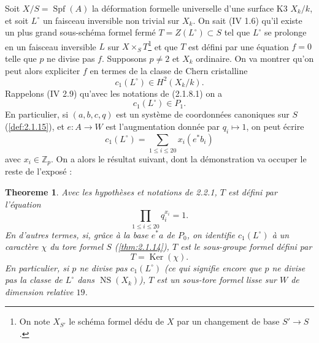 \documentclass[12pt,a4paper]{article}
\theoremstyle{plain}
\newtheorem{theorem}{Theoreme}[section]
\theoremstyle{definition}
\theoremstyle{remark}
\DeclareMathOperator{\Ker}{Ker}
\DeclareMathOperator{\Spf}{Spf}
\providecommand{\Ker}{\operatorname{Ker}}
\providecommand{\NS}{\operatorname{NS}}
\begin{document}
\subsubsection{}
Soit $X/S = \Spf(A)$ la d\'eformation formelle universelle d'une surface K3 $X_k/k$, et soit $L^\circ$ un faisceau inversible non trivial sur $X_k$. On sait (IV 1.6) qu'il existe un plus grand sous-sch\'ema formel ferm\'e $T = Z(L^\circ) \subset S$ tel que $L^\circ$ se prolonge en un faisceau inversible $L$ sur $X \times_S T$\footnote{On note $X_{S'}$ le sch\'ema formel d\'edu de $X$ par un changement de base $S' \to S$.} et que $T$ est d\'efini par une \'equation $f = 0$ telle que $p$ ne divise pas $f$. Supposons $p \neq 2$ et $X_k$ ordinaire. On va montrer qu'on peut alors expliciter $f$ en termes de la classe de Chern cristalline
\begin{equation}\tag{2.2.1.1}
c_1(L^\circ) \in H^2(X_k/k). 
\end{equation}
Rappelons (IV 2.9) qu'avec les notations de (2.1.8.1) on a
\begin{equation}\tag{2.2.1.2}
c_1(L^\circ) \in P_1. 
\end{equation}
En particulier, si $(a, b, c, q)$ est un syst\`eme de coordonn\'ees canoniques sur $S$ (\ref{def:2.1.15}), et $e : A \to W$ est l'augmentation donn\'ee par $q_i \mapsto 1$, on peut \'ecrire
\begin{equation}\tag{2.2.1.3}
c_1(L^\circ) = \sum_{1\leqslant i\leqslant 20} x_i (e^*b_i) 
\end{equation}
avec $x_i \in \mathbb{Z}_p$. On a alors le r\'esultat suivant, dont la d\'emonstration va occuper le reste de l'expos\'e :

\begin{theorem}\label{thm:2.2.2}
Avec les hypoth\`eses et notations de 2.2.1, $T$ est d\'efini par l'\'equation
\begin{equation}\tag{2.2.2.1}
\prod_{1\leqslant i\leqslant 20} q_i^{x_i} = 1. 
\end{equation}
En d'autres termes, si, gr\^ace \`a la base $e^*a$ de $P_0$, on identifie $c_1(L^\circ)$ \`a un caract\`ere $\chi$ du tore formel $S$ (\ref{thm:2.1.14}), $T$ est le sous-groupe formel d\'efini par
\begin{equation}\tag{2.2.2.2}
T = \Ker(\chi). 
\end{equation}
En particulier, si $p$ ne divise pas $c_1(L^\circ)$ (ce qui signifie encore \cite[1.4]{Ogus1979} que $p$ ne divise pas la classe de $L^\circ$ dans $\NS(X_k)$), $T$ est un sous-tore formel lisse sur $W$ de dimension relative $19$.
\end{theorem}
\end{document}
